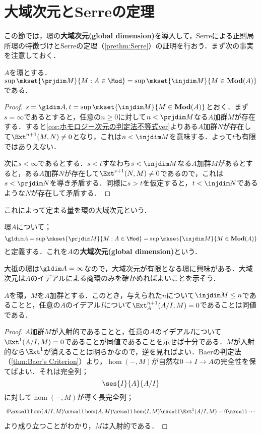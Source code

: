 \section{大域次元とSerreの定理}

この節では，環の\textbf{大域次元(global dimension)}を導入して，Serreによる正則局所環の特徴づけとSerreの定理（\ref{prethm:Serre}）の証明を行おう．まず次の事実を注意しておく．

\begin{prop}
	$A$を環とする．$\sup\mkset{\prjdim M}{M:A\in\Mod}=\sup\mkset{\injdim M}{M\in\mathbf{Mod}(A)}$である．
\end{prop}

\begin{proof}
	$s=\gldim A, t=\sup\mkset{\injdim M}{M\in\mathbf{Mod}(A)}$とおく．まず$s=\infty$であるとすると，任意の$n\geq 0$に対して$n<\prjdim M$なる$A$加群$M$が存在する．すると\ref{cor:ホモロジー次元の判定法不等式ver}よりある$A$加群$N$が存在して$\Ext^{n+1}(M,N)\neq 0$となり，これは$n<\injdim M$を意味する．よって$t$も有限ではありえない．
	
	次に$s<\infty$であるとする．$s<t$すなわち$s<\injdim M$なる$A$加群$M$があるとすると，ある$A$加群$N$が存在して$\Ext^{s+1}(N,M)\neq 0$であるので，これは$s<\prjdim N$を導き矛盾する．同様に$s>t$を仮定すると，$t<\injdim N$であるような$N$が存在して矛盾する．
\end{proof}	

これによって定まる量を環の大域次元という．

\begin{defi}[大域次元]
	環$A$について；
	\[\gldim A=\sup\mkset{\prjdim M}{M:A\in\Mod}=\sup\mkset{\injdim M}{M\in\mathbf{Mod}(A)}\]
	と定義する．これを$A$の\textbf{大域次元(global dimension)}という．
\end{defi}

大抵の環は$\gldim A=\infty$なので，大域次元が有限となる環に興味がある．大域次元は$A$のイデアルによる商環のみを確かめればよいことを示そう．

\begin{prop}\label{prop:injdimのイデアルによる判定}
	$A$を環，$M$を$A$加群とする．このとき，与えられた$n$について$\injdim M\leq n$であることと，任意の$A$のイデアル$I$について$\Ext^{n+1}_A(A/I,M)=0$であることは同値である．
\end{prop}

\begin{proof}
	$A$加群$M$が入射的であることと，任意の$A$のイデアル$I$について$\Ext^1(A/I,M)=0$であることが同値であることを示せば十分である．$M$が入射的なら$\Ext^1$が消えることは明らかなので，逆を見ればよい．Baerの判定法（\ref{thm:Baer's Criterion}）より，$\hom(-,M)$が自然な$0\to I\to A$の完全性を保てばよい．それは完全列；
	\[\ses{I}{A}{A/I}\]
	に対して$\hom(-,M)$が導く長完全列；
	\[\begin{tikzcd}
	0\nxcell \hom(A/I,M)\nxcell\hom(A,M)\nxcell\hom(I,M)\nxcell\Ext^1(A/I,M)=0\nxcell\cdots
	\end{tikzcd}\]
	より成り立つことがわかり，$M$は入射的である．
\end{proof}

